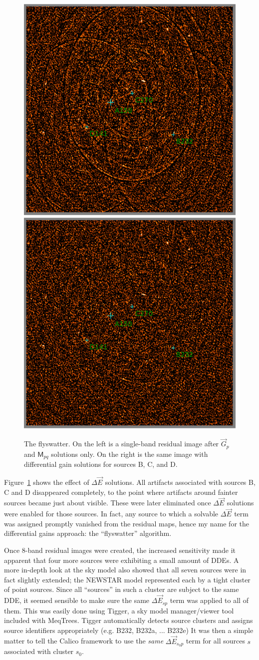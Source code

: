 \documentclass[]{aa}
\newcommand{\jones}[2]{\vec {#1}_{#2}}
\newcommand{\coh}[2]{\mathsf{{#1}}_{{#2}}}
\begin{document}
\begin{figure}
\begin{centering}
\includegraphics[width=.5\columnwidth]{before_dE}%
\includegraphics[width=.5\columnwidth]{after_dE}\par
\end{centering}
\caption{\label{fig:dEsol}The flyswatter. On the left is a single-band residual image after  $\jones{G}{p}$ and $\coh{M}{pq}$ solutions only. On the right is the same image with differential gain solutions for sources B, C, and D.}
\end{figure}

Figure~\ref{fig:dEsol} shows the effect of $\Delta\jones{E}{}$ solutions. All artifacts associated with sources B, C and D disappeared completely, to the point where artifacts around fainter sources became just about visible. These were later eliminated once $\Delta\jones{E}{}$ solutions were enabled for those sources. In fact, any source to which a solvable $\Delta\jones{E}{}$ term was assigned promptly vanished from the residual maps, hence my name for the differential gains approach: the ``flyswatter'' algorithm. 

Once 8-band residual images were created, the increased sensitivity made it apparent that four more sources were exhibiting a small amount of DDEs. A more in-depth look at the sky model also showed that all seven sources were in fact slightly extended; the NEWSTAR model represented each by a tight cluster of point sources. Since all ``sources'' in such a cluster are subject to the same DDE, it seemed sensible to make sure the same $\Delta\jones{E}{sp}$ term was applied to all of them. This was easily done using Tigger, a sky model manager/viewer tool included with MeqTrees. Tigger automatically detects source clusters and assigns source identifiers appropriately (e.g. B232, B232a, ...  B232e) It was then a simple matter to tell the Calico framework to use the \emph{same} $\Delta\jones{E}{s_0 p}$ term for all sources $s$ associated with cluster $s_0$. 
\end{document}
